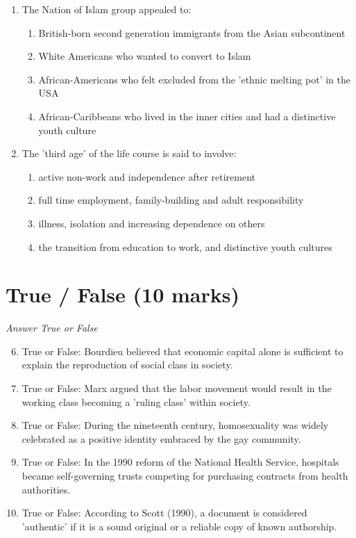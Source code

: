 \documentclass[12pt]{article}
\begin{document}
\begin{enumerate}[label=\arabic*.]
\item The Nation of Islam group appealed to:
\begin{enumerate}[label=(\alph*)]
    \item British-born second generation immigrants from the Asian subcontinent
    \item White Americans who wanted to convert to Islam
    \item African-Americans who felt excluded from the 'ethnic melting pot' in the USA
    \item African-Caribbeans who lived in the inner cities and had a distinctive youth culture
\end{enumerate}
\item The 'third age' of the life course is said to involve:
\begin{enumerate}[label=(\alph*)]
    \item active non-work and independence after retirement
    \item full time employment, family-building and adult responsibility
    \item illness, isolation and increasing dependence on others
    \item the transition from education to work, and distinctive youth cultures
\end{enumerate}
\end{enumerate}

\section*{True / False (10 marks)}
\textit{Answer True or False}
\begin{enumerate}[label=\arabic*.]
\setcounter{enumi}{5}
\item True or False: Bourdieu believed that economic capital alone is sufficient to explain the reproduction of social class in society.
\item True or False: Marx argued that the labor movement would result in the working class becoming a 'ruling class' within society.
\item True or False: During the nineteenth century, homosexuality was widely celebrated as a positive identity embraced by the gay community.
\item True or False: In the 1990 reform of the National Health Service, hospitals became self-governing trusts competing for purchasing contracts from health authorities.
\item True or False: According to Scott (1990), a document is considered 'authentic' if it is a sound original or a reliable copy of known authorship.
\end{enumerate}
\end{document}
